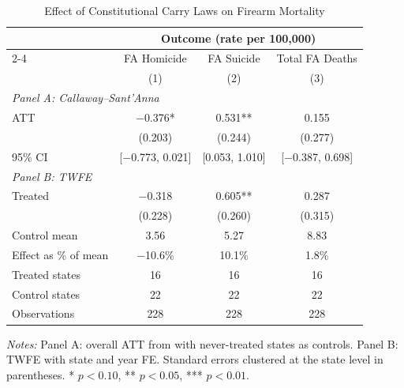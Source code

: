 \begin{table}[H]
\centering
\caption{Effect of Constitutional Carry Laws on Firearm Mortality}
\begin{threeparttable}
\begin{tabular}{lccc}
\toprule
& \multicolumn{3}{c}{Outcome (rate per 100,000)} \\
\cmidrule(lr){2-4}
& FA Homicide & FA Suicide & Total FA Deaths \\
& (1) & (2) & (3) \\
\midrule
\multicolumn{4}{l}{\textit{Panel A: Callaway--Sant'Anna}} \\[3pt]
ATT & $-$0.376* & 0.531** & 0.155 \\
& (0.203) & (0.244) & (0.277) \\
95\% CI & [$-$0.773, 0.021] & [0.053, 1.010] & [$-$0.387, 0.698] \\[6pt]
\multicolumn{4}{l}{\textit{Panel B: TWFE}} \\[3pt]
Treated & $-$0.318 & 0.605** & 0.287 \\
& (0.228) & (0.260) & (0.315) \\
\midrule
Control mean & 3.56 & 5.27 & 8.83 \\
Effect as \% of mean & $-$10.6\% & 10.1\% & 1.8\% \\
Treated states & 16 & 16 & 16 \\
Control states & 22 & 22 & 22 \\
Observations & 228 & 228 & 228 \\
\bottomrule
\end{tabular}
\begin{tablenotes}[flushleft]
\small
\item \textit{Notes:} Panel A: overall ATT from \citet{callaway2021} with never-treated states as controls. Panel B: TWFE with state and year FE. Standard errors clustered at the state level in parentheses. * $p<0.10$, ** $p<0.05$, *** $p<0.01$.
\end{tablenotes}
\end{threeparttable}
\label{tab:main}
\end{table}
